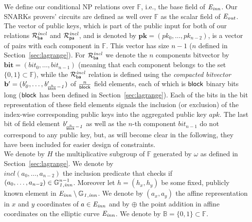 \noindent We define our conditional NP relations over $\mathbb{F}$, i.e., the base field of $\mathit{E}_{\mathit{inn}}$. 
Our SNARKs provers' circuits are defined as well over $\mathbb{F}$ as the scalar field of $\mathit{E}_{\mathit{out}}$. The vector of public keys, which is part of the public input for both of our 
relations $\mathcal{R}^{\mathit{incl}}_{\mathsf{ba}}$ and $\mathcal{R}^{\mathit{incl}}_{\mathsf{pa}}$, and is denoted by $\mathbf{pk} = (\mathit{pk_0}, \ldots, \mathit{pk_{n-2}})$, is a vector of pairs with each component 
in $\mathbb{F}$. This vector has size $n-1$ ($n$ defined in 
Section~\ref{sec:lagrange}). For $\mathcal{R}^{\mathit{incl}}_{\mathsf{ba}}$ we denote 
the $n$ components bitvector by $\mathbf{bit} = (\mathit{bit_0}, \ldots, \mathit{bit_{n-1}})$ 
(meaning that each component belongs to the set $\{0,1\} \subset \mathbb{F}$), 
while the $\mathcal{R}^{\mathit{incl}}_{\mathsf{ba}}$ relation is defined using the \emph{compacted bitvector} 
$\mathbf{b'} = (\mathit{b'_{0}}, \ldots, \mathit{b'_{\frac{n}{\mathsf{block}}-1}})$ of $\frac{n}{\mathsf{block}}$ field elements, 
each of which is $\mathsf{block}$ binary bits long ($\mathsf{block}$ has been defined in Section~\ref{sec:lagrange}). 
Each of the bits in the bit representation of these field elements signals the 
inclusion (or exclusion) of the index-wise corresponding public keys into the aggregated public key $\mathit{apk}$. The last bit of field element $\mathit{b'_{\frac{n}{\mathsf{block}}-1}}$ as well as the $n$-th component $\mathit{bit_{n-1}}$ do not correspond to any public key, 
but, as will become clear in the following, they have been included for easier design of constraints. \\ 
\vspace{-0.009in}
\noindent We denote by $H$ the multiplicative subgroup of $\mathbb{F}$ generated 
by $\omega$ as defined in Section~\ref{sec:lagrange}. We denote by \\ $\mathit{incl}(a_0, \ldots, a_{n-2})$ the inclusion 
predicate that checks if \\ $(a_0, \ldots, a_{n-2}) \in \mathbb{G}_{\mathit{1,inn}}^{n-1}$. Moreover let $h = (\mathit{h_x}, \mathit{h_y})$ 
be some fixed, publicly known element in $\mathit{E}_{\mathit{inn}} \setminus \mathbb{G}_{\mathit{1,inn}}$. We denote by $(a_x, a_y)$ the affine representation in 
$x$ and $y$ coordinates of $a \in \mathit{E}_{\mathit{inn}}$ and by $\oplus$ the point addition in affine coordinates on the elliptic curve $\mathit{E}_{\mathit{inn}}$. 
We denote by $\mathbb{B} = \{0,1\} \subset \mathbb{F}$. \\
\vspace{-0.15in}

\vspace{-0.1in}
